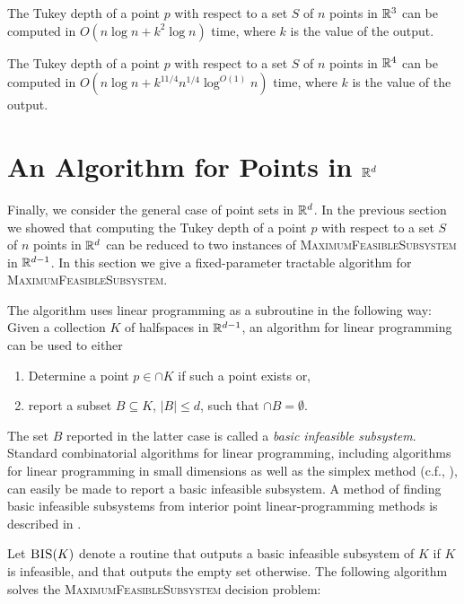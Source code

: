 \documentclass[charterfonts,lotsofwhite]{patmorin}
\begin{document}
\begin{thm}
The Tukey depth of a point $p$ with respect to a set $S$ of $n$ points
in $\mathbb{R}^3$ can be computed in $O(n\log n + k^2\log n)$ time, where
$k$ is the value of the output.
\end{thm}


\begin{thm}
The Tukey depth of a point $p$ with respect to a set $S$ of $n$ points
in $\mathbb{R}^4$ can be computed in $O(n\log n + k^{11/4}n^{1/4}\log^{O(1)}
n)$ time, where $k$ is the value of the output.
\end{thm}

\section{An Algorithm for Points in $\mathbb{R}^d$}

Finally, we consider the general case of point sets in $\mathbb{R}^d$.  In the
previous section we showed that computing the Tukey depth of a point
$p$ with respect to a set $S$ of $n$ points in $\mathbb{R}^d$ can be reduced
to two instances of \textsc{MaximumFeasibleSubsystem} in $\mathbb{R}^{d-1}$.
In this section we give a fixed-parameter tractable \cite{df98}
algorithm for \textsc{MaximumFeasibleSubsystem}.  

The algorithm uses linear programming as a subroutine in the following
way:  Given a collection $K$ of halfspaces in $\mathbb{R}^{d-1}$, an algorithm
for linear programming can be used to either
\begin{enumerate}
\item Determine a point $p\in\cap K$ if such a point exists or,
\item report a subset $B\subseteq K$, $|B|\le d$, such that 
	$\cap B=\emptyset$.
\end{enumerate}
The set $B$ reported in the latter case is called a \emph{basic
infeasible subsystem}.  Standard combinatorial algorithms for linear
programming, including algorithms for linear programming in small
dimensions \cite{c95,d84,m83,m84,s91,sw92} as well as the simplex
method (c.f., \cite{chvatal80}), can easily be made to report a basic
infeasible subsystem.  A method of finding basic infeasible subsystems
from interior point linear-programming methods is described in
.

Let $\textsc{BIS}(K)$ denote a routine that outputs a basic infeasible
subsystem of $K$ if $K$ is infeasible, and that outputs the empty set
otherwise.  The following algorithm solves the
\textsc{MaximumFeasibleSubsystem} decision problem:
\end{document}
